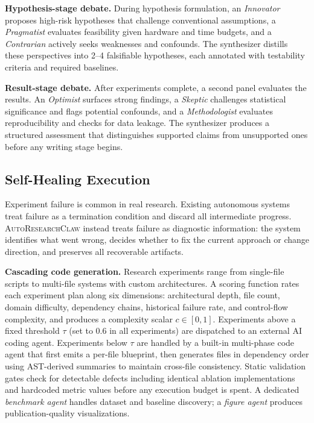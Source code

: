 \documentclass{llmxive}
\providecommand{\system}{\textsc{AutoResearchClaw}}
\begin{document}
\noindent \textbf{Hypothesis-stage debate.}
During hypothesis formulation, an \emph{Innovator} proposes high-risk hypotheses that challenge conventional assumptions, a \emph{Pragmatist} evaluates feasibility given hardware and time budgets, and a \emph{Contrarian} actively seeks weaknesses and confounds.
The synthesizer distills these perspectives into 2--4 falsifiable hypotheses, each annotated with testability criteria and required baselines.

\noindent \textbf{Result-stage debate.}
After experiments complete, a second panel evaluates the results.
An \emph{Optimist} surfaces strong findings, a \emph{Skeptic} challenges statistical significance and flags potential confounds, and a \emph{Methodologist} evaluates reproducibility and checks for data leakage.
The synthesizer produces a structured assessment that distinguishes supported claims from unsupported ones before any writing stage begins.

\vspace{-0.3em}
\subsection{Self-Healing Execution}
\label{sec:selfheal}
\vspace{-0.3em}

Experiment failure is common in real research.
Existing autonomous systems treat failure as a termination condition and discard all intermediate progress.
\system{} instead treats failure as diagnostic information: the system identifies what went wrong, decides whether to fix the current approach or change direction, and preserves all recoverable artifacts.

\noindent \textbf{Cascading code generation.}
Research experiments range from single-file scripts to multi-file systems with custom architectures.
A scoring function rates each experiment plan along six dimensions: architectural depth, file count, domain difficulty, dependency chains, historical failure rate, and control-flow complexity, and produces a complexity scalar $c \in [0,1]$.
Experiments above a fixed threshold $\tau$ (set to $0.6$ in all experiments) are dispatched to an external AI coding agent.
Experiments below $\tau$ are handled by a built-in multi-phase code agent that first emits a per-file blueprint, then generates files in dependency order using AST-derived summaries to maintain cross-file consistency.
Static validation gates check for detectable defects including identical ablation implementations and hardcoded metric values before any execution budget is spent.
A dedicated \emph{benchmark agent} handles dataset and baseline discovery; a \emph{figure agent} produces publication-quality visualizations.
\end{document}
